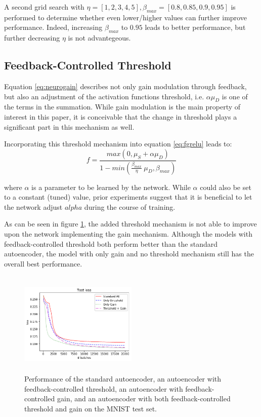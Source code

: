 \documentclass{article}
\begin{document}
A second grid search with $\eta = [1, 2, 3, 4, 5], \beta_{max} = [0.8, 0.85, 0.9, 0.95]$ is performed to determine whether even lower/higher values can further improve performance. Indeed, increasing $\beta_{max}$ to $0.95$ leads to better performance, but further decreasing $\eta$ is not advantegeous. 


\subsection{Feedback-Controlled Threshold} 
Equation \ref{eq:neurogain} describes not only gain modulation through feedback, but also an adjustment of the activation functions threshold, i.e. $\alpha \mu_D$ is one of the terms in the summation. While gain modulation is the main property of interest in this paper, it is conceivable that the change in threshold plays a significant part in this mechanism as well. 

Incorporating this threshold mechanism into equation \ref{eq:fgrelu} leads to: 
\begin{equation}
	f = \frac{max(0, \mu_S + \alpha \mu_D)}{1 - min(\frac{\beta_{max}}{\eta} \ \mu_D, \beta_{max})} 
\end{equation}

where $\alpha$ is a parameter to be learned by the network. While $\alpha$ could also be set to a constant (tuned) value, prior experiments suggest that it is beneficial to let the network adjust $alpha$ during the course of training. 

As can be seen in figure \ref{fig:threshold}, the added threshold mechanism is not able to improve upon the network implementing the gain mechanism. Although the models with feedback-controlled threshold both perform better than the standard autoencoder, the model with only gain and no threshold mechanism still has the overall best performance. 

\begin{figure}[H]
      \centering
      \includegraphics[width=0.5\textwidth,height=5cm,keepaspectratio]{img/appendix/threshold/threshold_test.png}
            \caption{Performance of the standard autoencoder, an autoencoder with feedback-controlled threshold, an autoencoder with feedback-controlled gain, and an autoencoder with both feedback-controlled threshold and gain on the MNIST test set.}
      \label{fig:threshold}
  \end{figure}
\end{document}

